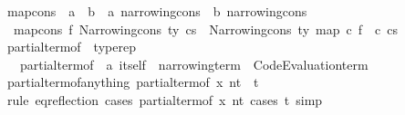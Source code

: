 \begin{isabellebody}
\isanewline
{}\isamarkupfalse%
\ map{\isacharunderscore}{\kern0pt}cons\ {\isacharcolon}{\kern0pt}{\isacharcolon}{\kern0pt}\ {\isachardoublequoteopen}{\isacharparenleft}{\kern0pt}{\isacharprime}{\kern0pt}a\ {\isacharequal}{\kern0pt}{\isachargreater}{\kern0pt}\ {\isacharprime}{\kern0pt}b{\isacharparenright}{\kern0pt}\ {\isacharequal}{\kern0pt}{\isachargreater}{\kern0pt}\ {\isacharprime}{\kern0pt}a\ narrowing{\isacharunderscore}{\kern0pt}cons\ {\isacharequal}{\kern0pt}{\isachargreater}{\kern0pt}\ {\isacharprime}{\kern0pt}b\ narrowing{\isacharunderscore}{\kern0pt}cons{\isachardoublequoteclose}\isanewline
{}\isanewline
\ \ {\isachardoublequoteopen}map{\isacharunderscore}{\kern0pt}cons\ f\ {\isacharparenleft}{\kern0pt}Narrowing{\isacharunderscore}{\kern0pt}cons\ ty\ cs{\isacharparenright}{\kern0pt}\ {\isacharequal}{\kern0pt}\ Narrowing{\isacharunderscore}{\kern0pt}cons\ ty\ {\isacharparenleft}{\kern0pt}map\ {\isacharparenleft}{\kern0pt}{\isasymlambda}c{\isachardot}{\kern0pt}\ f\ {\isasymcirc}\ c{\isacharparenright}{\kern0pt}\ cs{\isacharparenright}{\kern0pt}{\isachardoublequoteclose}%
\isadelimdocument
%
\endisadelimdocument
%
\isatagdocument
%
\isamarkuptrue%
%
\endisatagdocument
{\isafolddocument}%
%
\isadelimdocument
%
\endisadelimdocument
{}\isamarkupfalse%
\ partial{\isacharunderscore}{\kern0pt}term{\isacharunderscore}{\kern0pt}of\ {\isacharequal}{\kern0pt}\ typerep\ {\isacharplus}{\kern0pt}\isanewline
\ \ \ partial{\isacharunderscore}{\kern0pt}term{\isacharunderscore}{\kern0pt}of\ {\isacharcolon}{\kern0pt}{\isacharcolon}{\kern0pt}\ {\isachardoublequoteopen}{\isacharprime}{\kern0pt}a\ itself\ {\isacharequal}{\kern0pt}{\isachargreater}{\kern0pt}\ narrowing{\isacharunderscore}{\kern0pt}term\ {\isacharequal}{\kern0pt}{\isachargreater}{\kern0pt}\ Code{\isacharunderscore}{\kern0pt}Evaluation{\isachardot}{\kern0pt}term{\isachardoublequoteclose}\isanewline
\isanewline
{}\isamarkupfalse%
\ partial{\isacharunderscore}{\kern0pt}term{\isacharunderscore}{\kern0pt}of{\isacharunderscore}{\kern0pt}anything{\isacharcolon}{\kern0pt}\ {\isachardoublequoteopen}partial{\isacharunderscore}{\kern0pt}term{\isacharunderscore}{\kern0pt}of\ x\ nt\ {\isasymequiv}\ t{\isachardoublequoteclose}\isanewline
%
\isadelimproof
\ \ %
\endisadelimproof
%
\isatagproof
{}\isamarkupfalse%
\ {\isacharparenleft}{\kern0pt}rule\ eq{\isacharunderscore}{\kern0pt}reflection{\isacharparenright}{\kern0pt}\ {\isacharparenleft}{\kern0pt}cases\ {\isachardoublequoteopen}partial{\isacharunderscore}{\kern0pt}term{\isacharunderscore}{\kern0pt}of\ x\ nt{\isachardoublequoteclose}{\isacharcomma}{\kern0pt}\ cases\ t{\isacharcomma}{\kern0pt}\ simp{\isacharparenright}{\kern0pt}%

\end{isabellebody}
